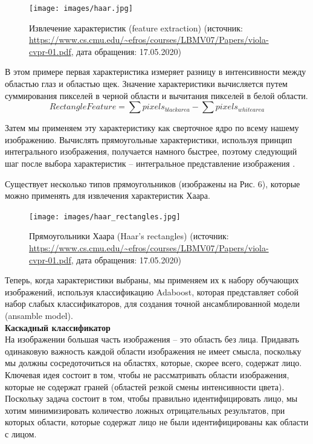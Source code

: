 \documentclass[14pt]{matmex-diploma-custom}
\begin{document}
        \begin{figure}[h]
            \centering
            \texttt{[image: images/haar.jpg]}
            \caption{Извлечение характеристик (feature extraction) (источник: \url{https://www.cs.cmu.edu/~efros/courses/LBMV07/Papers/viola-cvpr-01.pdf}, дата обращения: 17.05.2020)}
        \end{figure}
        
        В этом примере первая характеристика измеряет разницу в интенсивности между областью глаз и областью щек. Значение характеристики вычисляется путем суммирования пикселей в черной области и вычитания пикселей в белой области.
        $$RectangleFeature = \sum{pixels_{blackarea}} - \sum{pixels_{whitearea}}$$ \par
        Затем мы применяем эту характеристику как сверточное ядро по всему нашему изображению. Вычислять прямоугольные характеристики, используя принцип интегрального изображения, получается намного быстрее, поэтому следующий шаг после выбора характеристик -- интегральное представление изображения \cite{v:j}.
        
        Существует несколько типов прямоугольников (изображены на Рис. 6), которые можно применять для извлечения характеристик Хаара. 
        
        \begin{figure}[h]
            \centering
            \texttt{[image: images/haar\_rectangles.jpg]}
            \caption{Прямоугольники Хаара (Haar's rectangles) (источник: \url{https://www.cs.cmu.edu/~efros/courses/LBMV07/Papers/viola-cvpr-01.pdf}, дата обращения: 17.05.2020)}
        \end{figure}
        
        Теперь, когда характеристики выбраны, мы применяем их к набору обучающих изображений, используя классификацию Adaboost, которая представляет собой набор слабых классификаторов, для создания точной ансамблированной модели (ansamble model).\\
    \textbf{Каскадный классификатор} \\ 
        На изображении большая часть изображения -- это область без лица. Придавать одинаковую важность каждой области изображения не имеет смысла, поскольку мы должны сосредоточиться на областях, которые, скорее всего, содержат лицо. 
        Ключевая идея состоит в том, чтобы не рассматривать области изображения, которые не содержат граней (областей резкой смены интенсивности цвета). Поскольку задача состоит в том, чтобы правильно идентифицировать лицо, мы хотим минимизировать количество ложных отрицательных результатов, при которых области, которые содержат лицо не были идентифицированы как области с лицом.
        
\end{document}
